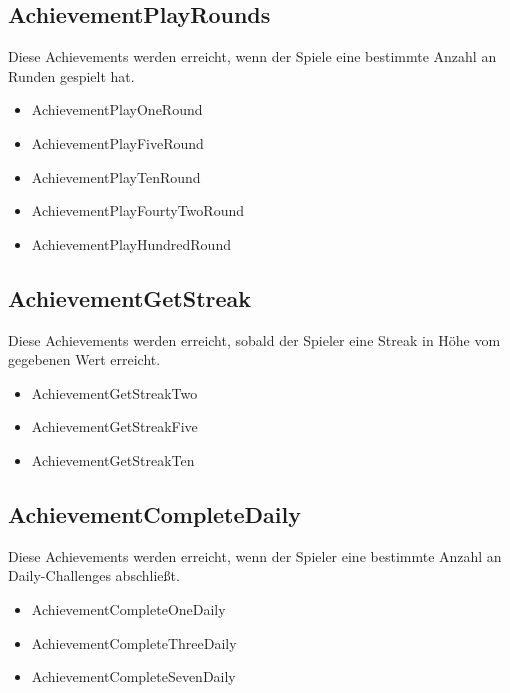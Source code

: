 \documentclass[a4paper]{scrreprt}
\begin{document}
    \subsection{AchievementPlayRounds}
    Diese Achievements werden erreicht, wenn der Spiele eine bestimmte Anzahl an Runden gespielt hat. \\
    \begin{itemize}
        \item AchievementPlayOneRound
        \item AchievementPlayFiveRound
        \item AchievementPlayTenRound
        \item AchievementPlayFourtyTwoRound
        \item AchievementPlayHundredRound
    \end{itemize}

    \subsection{AchievementGetStreak}
    Diese Achievements werden erreicht, sobald der Spieler eine Streak in Höhe vom gegebenen Wert erreicht. \\
    \begin{itemize}
        \item AchievementGetStreakTwo
        \item AchievementGetStreakFive
        \item AchievementGetStreakTen
    \end{itemize}

    \newpage
    \subsection{AchievementCompleteDaily}
    Diese Achievements werden erreicht, wenn der Spieler eine bestimmte Anzahl an Daily-Challenges abschließt. \\
    \begin{itemize}
        \item AchievementCompleteOneDaily
        \item AchievementCompleteThreeDaily
        \item AchievementCompleteSevenDaily
    \end{itemize}
\end{document}
